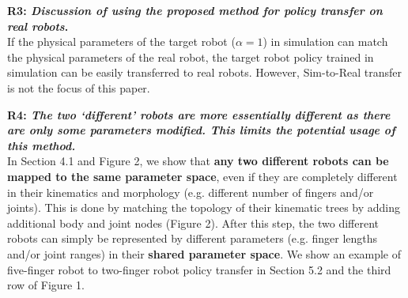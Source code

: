 \documentclass[nohyperref]{article}
\theoremstyle{plain}
\theoremstyle{definition}
\theoremstyle{remark}
\begin{document}


\textbf{\textcolor{viz_blue}{R3}: \textit{Discussion of using the proposed method for policy transfer on real robots}. } \\
If the physical parameters of the target robot ($\alpha=1$) in simulation can match the physical parameters of the real robot, the target robot policy trained in simulation can be easily transferred to real robots.
However, Sim-to-Real transfer is not the focus of this paper.

\textbf{\textcolor{viz_yellow}{R4}: \textit{The two `different' robots are more essentially different as there are only some parameters modified. This limits the potential usage of this method.}} \\
In Section 4.1 and Figure 2, we show that \textcolor{viz_red}{\textbf{any two different robots can be mapped to the same parameter space}}, even if they are completely different in their kinematics and morphology (e.g. different number of fingers and/or joints).
This is done by matching the topology of their kinematic trees by adding additional body and joint nodes (Figure 2).
After this step, the two different robots can simply be represented by different parameters (e.g. finger lengths and/or joint ranges) in their \textcolor{viz_red}{\textbf{shared parameter space}}.
We show an example of five-finger robot to two-finger robot policy transfer in Section 5.2 and the third row of Figure 1.
\end{document}
